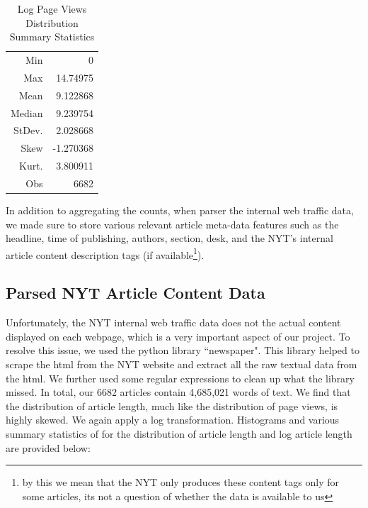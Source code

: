 \documentclass[fleqn,12pt]{SelfArx} %
\begin{document}
\begin{table}[hbt]
\caption{Log Page Views Distribution Summary Statistics}
\centering
\begin{tabular}{rr}
\toprule
Min               &  0\\
Max               &  14.74975\\  
Mean              &  9.122868\\
Median            &  9.239754\\
StDev.            &  2.028668\\
Skew              &  -1.270368\\
Kurt.             &  3.800911\\
\midrule
Obs &  6682\\
\bottomrule
\end{tabular}
\end{table}


In addition to aggregating the counts, when parser the internal web traffic data, we made sure to store various relevant article meta-data features such as the headline, time of publishing, authors, section, desk, and the NYT's internal article content description tags (if available\footnote{by this we mean that the NYT only produces these content tags only for some articles, its not a question of whether the data is available to us}).

\subsection{Parsed NYT Article Content Data}
Unfortunately, the NYT internal web traffic data does not the actual content displayed on each webpage, which is a very important aspect of our project. To resolve this issue, we used the python library ``newspaper". This library helped to scrape the html from the NYT website and extract all the raw textual data from the html. We further used some regular expressions to clean up what the library missed. In total, our 6682 articles contain 4,685,021 words of text.  We find that the distribution of article length, much like the distribution of page views, is highly skewed. We again apply a log transformation. Histograms and various summary statistics of for the distribution of article length and log article length are provided below:
\end{document}
